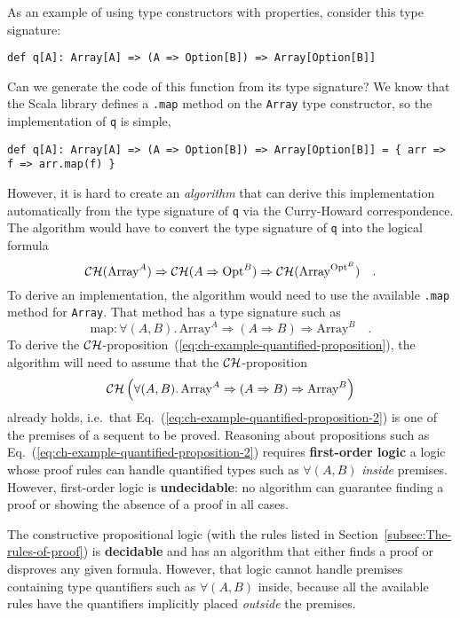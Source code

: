 As an example of using type constructors with properties, consider
this type signature:
\begin{lstlisting}
def q[A]: Array[A] => (A => Option[B]) => Array[Option[B]]
\end{lstlisting}
Can we generate the code of this function from its type signature?
We know that the Scala library defines a \lstinline!.map! method
on the \lstinline!Array! type constructor, so the implementation
of \lstinline!q! is simple,
\begin{lstlisting}
def q[A]: Array[A] => (A => Option[B]) => Array[Option[B]] = { arr => f => arr.map(f) }
\end{lstlisting}
However, it is hard to create an \emph{algorithm} that can derive
this implementation automatically from the type signature of \lstinline!q!
via the Curry-Howard correspondence. The algorithm would have to convert
the type signature of \lstinline!q! into the logical formula 
\begin{equation}
{\cal CH}(\text{Array}^{A})\Rightarrow{\cal CH}(A\Rightarrow\text{Opt}^{B})\Rightarrow{\cal CH}(\text{Array}^{\text{Opt}^{B}})\quad.\label{eq:ch-example-quantified-proposition}
\end{equation}
To derive an implementation, the algorithm would need to use the available
\lstinline!.map! method for \lstinline!Array!. That method has a
type signature such as
\[
\text{map}:\forall(A,B).\,\text{Array}^{A}\Rightarrow\left(A\Rightarrow B\right)\Rightarrow\text{Array}^{B}\quad.
\]
To derive the ${\cal CH}$-proposition~(\ref{eq:ch-example-quantified-proposition}),
the algorithm will need to assume that the ${\cal CH}$-proposition
\begin{equation}
{\cal CH}\left(\forall(A,B).\,\text{Array}^{A}\Rightarrow\left(A\Rightarrow B\right)\Rightarrow\text{Array}^{B}\right)\label{eq:ch-example-quantified-proposition-2}
\end{equation}
already holds, i.e.~that Eq.~(\ref{eq:ch-example-quantified-proposition-2})
is one of the premises of a sequent to be proved. Reasoning about
propositions such as Eq.~(\ref{eq:ch-example-quantified-proposition-2})
requires \textbf{first-order logic} \textendash{}
a logic whose proof rules can handle quantified types such as $\forall(A,B)$\emph{
inside} premises. However, first-order logic is \textbf{undecidable}:
no algorithm can guarantee finding a proof or showing the absence
of a proof in all cases. 

The constructive propositional logic (with the rules listed in Section~\ref{subsec:The-rules-of-proof})
is \textbf{decidable} and has an algorithm that either finds a proof
or disproves any given formula. However, that logic cannot handle
premises containing type quantifiers such as $\forall(A,B)$ inside,
because all the available rules have the quantifiers implicitly placed
\emph{outside} the premises. 

